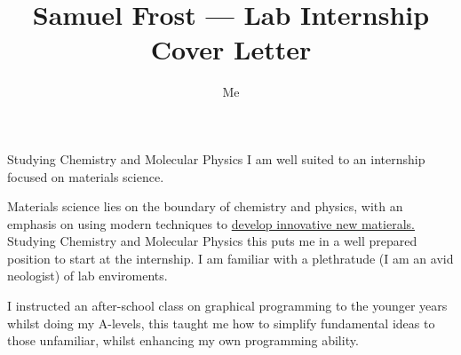 \documentclass{article}
\title{Samuel Frost --- Lab Internship Cover Letter}
\author{Me}
\date{}
\begin{document}
\maketitle
Studying Chemistry and Molecular Physics I am well suited to an internship focused on materials science.

Materials science lies on the boundary of chemistry and physics, with an emphasis on using modern techniques
to \underline{develop innovative new matierals.} Studying Chemistry and Molecular Physics this puts me in a 
well prepared position to start at the internship. I am familiar with a plethratude (I am an avid neologist)
of lab enviroments.

I instructed an after-school class on graphical programming to the younger years whilst doing my A-levels, 
this taught me how to simplify fundamental ideas to those unfamiliar, whilst enhancing my own programming 
ability. 
\end{document}

